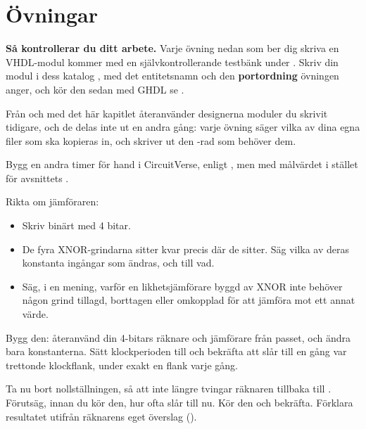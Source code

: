 
\section{Övningar}
\label{c7:sec:exercises}

\begin{aside}
\textbf{Så kontrollerar du ditt arbete.} Varje övning nedan som ber dig skriva en VHDL-modul kommer
med en självkontrollerande testbänk under . Skriv din modul i dess
katalog , med det entitetsnamn och den \textbf{portordning} övningen
anger, och kör den sedan med GHDL \textemdash{} se .

Från och med det här kapitlet återanvänder designerna moduler du skrivit tidigare, och de delas inte
ut en andra gång: varje övning säger vilka av dina egna filer som ska kopieras in, och skriver ut
den -rad som behöver dem.
\end{aside}


\label{c7:ex:byhand}
Bygg en andra timer för hand i CircuitVerse, enligt , men med målvärdet
 i stället för avsnittets .

 Rikta om jämföraren:
\begin{itemize}
  \item Skriv  binärt med 4 bitar.
  \item De fyra XNOR-grindarna sitter kvar precis där de sitter. Säg vilka av deras konstanta
    ingångar som ändras, och till vad.
  \item Säg, i en mening, varför en likhetsjämförare byggd av XNOR inte behöver någon grind
    tillagd, borttagen eller omkopplad för att jämföra mot ett annat värde.
\end{itemize}

 Bygg den: återanvänd din 4-bitars räknare och jämförare från passet, och ändra bara
konstanterna. Sätt klockperioden till  och bekräfta att  slår till en
gång var trettonde klockflank, under exakt en flank varje gång.

 Ta nu bort nollställningen, så att  inte längre tvingar räknaren tillbaka
till . Förutsäg, innan du kör den, hur ofta  slår till nu. Kör den och
bekräfta. Förklara resultatet utifrån räknarens eget överslag ().

